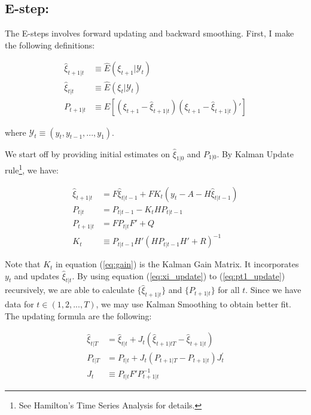 \documentclass[12pt]{article}
\numberwithin{equation}{section}
\begin{document}
\subsection{E-step:} \label{subsec:E}

The E-steps involves forward updating and backward smoothing. First, I make the following definitions:

\begin{align*}
    \hat{\xi}_{t+1|t} & \equiv \hat{E}(\xi_{t+1}|\mathcal{Y}_t) \\
    \hat{\xi}_{t|t} & \equiv \hat{E}(\xi_{t}|\mathcal{Y}_t) \\
    P_{t+1|t} & \equiv E[(\xi_{t+1} - \hat{\xi}_{t+1|t})(\xi_{t+1} - \hat{\xi}_{t+1|t})']
\end{align*}

where $\mathcal{Y}_t\equiv(y_t,y_{t-1},...,y_1)$. 

We start off by providing initial estimates on $\hat{\xi}_{1|0}$ and $P_{1|0}$. By Kalman Update rule\footnote{See Hamilton's Time Series Analysis for details.}, we have:

\begin{align}
    \hat{\xi}_{t+1|t} & = F\hat{\xi}_{t|t-1} + FK_t(y_t - A - H\hat{\xi}_{t|t-1}) \label{eq:xi_update} \\
    P_{t|t} & = P_{t|t-1} - K_tHP_{t|t-1} \label{eq:p_update} \\
    P_{t+1|t} & = FP_{t|t}F'+Q \label{eq:pt1_update} \\
    K_t & \equiv P_{t|t-1}H'(HP_{t|t-1}H'+R)^{-1} \label{eq:gain}
\end{align}

Note that $K_t$ in equation (\ref{eq:gain}) is the Kalman Gain Matrix. It incorporates $y_t$ and updates $\hat{\xi}_{t|t}$. By using equation (\ref{eq:xi_update}) to (\ref{eq:pt1_update}) recursively, we are able to calculate $\{\hat{\xi}_{t+1|t}\}$ and $\{P_{t+1|t}\}$ for all $t$. 
Since we have data for $t \in (1,2,...,T)$, we may use Kalman Smoothing to obtain better fit. The updating formula are the following:

\begin{align}
    \hat{\xi}_{t|T} & = \hat{\xi}_{t|t} + J_t(\hat{\xi}_{t+1|tT} - \hat{\xi}_{t+1|t}) \label{eq:xi_smooth} \\
    P_{t|T} & = P_{t|t} + J_{t}(P_{t+1|T} - P_{t+1|t})J_{t}^{'} \label{eq:p_smooth} \\
    J_t & \equiv P_{t|t}F'P_{t+1|t}^{-1} \label{eq:back_smooth}
\end{align}
\end{document}

